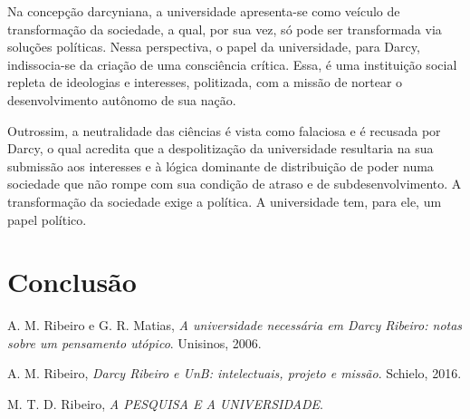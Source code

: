 \documentclass{sbrt}
\begin{document}
Na concepção darcyniana, a universidade apresenta-se como veículo de transformação da sociedade, a qual, por sua vez, só pode ser transformada via soluções políticas. Nessa perspectiva, o papel da universidade, para Darcy, indissocia-se da criação de uma consciência crítica. Essa, é uma instituição social repleta de ideologias e interesses, politizada, com a missão de nortear o desenvolvimento autônomo de sua nação.

Outrossim, a neutralidade das ciências é vista como falaciosa e é recusada por Darcy, o qual acredita que a despolitização da universidade resultaria na sua submissão aos interesses e à lógica dominante de distribuição de poder numa sociedade que não rompe com sua condição de atraso e de subdesenvolvimento. A transformação da sociedade exige a política. A universidade tem, para ele, um papel político.

\section{Conclusão}



\begin{thebibliography}{99}
 A. M. Ribeiro e G. R. Matias, \textit{A universidade necessária em Darcy Ribeiro: notas sobre  um pensamento utópico}. Unisinos, 2006.

 A. M. Ribeiro, \textit{Darcy Ribeiro e UnB: intelectuais, projeto e missão}. Schielo, 2016.

 M. T. D. Ribeiro, \textit{A PESQUISA E A UNIVERSIDADE}.
\end{thebibliography}
\end{document}
